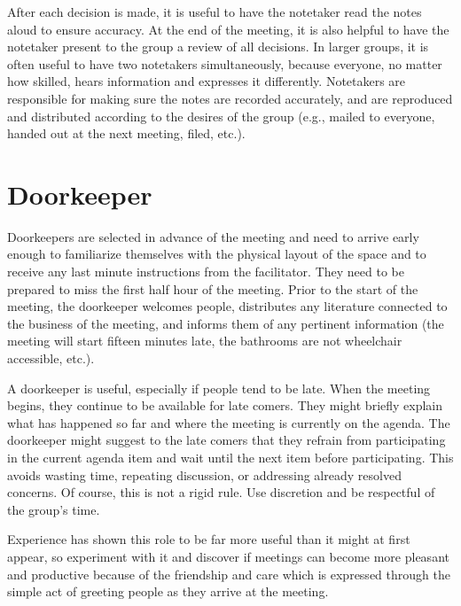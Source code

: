 \squishend%

After each decision is made, it is useful to have the notetaker
read the notes aloud to ensure accuracy. At the end of the meeting,
it is also helpful to have the notetaker present to the group a
review of all decisions. In larger groups, it is often useful to
have two notetakers simultaneously, because everyone, no matter how
skilled, hears information and expresses it differently. Notetakers
are responsible for making sure the notes are recorded accurately,
and are reproduced and distributed according to the desires of the
group (e.g., mailed to everyone, handed out at the next meeting,
filed, etc.).


\section{Doorkeeper}
\label{role:greeter}

Doorkeepers are selected in advance of the meeting and need to
arrive early enough to familiarize themselves with the physical
layout of the space and to receive any last minute instructions
from the facilitator. They need to be prepared to miss the first
half hour of the meeting. Prior to the start of the meeting, the
doorkeeper welcomes people, distributes any literature connected to
the business of the meeting, and informs them of any pertinent
information (the meeting will start fifteen minutes late, the
bathrooms are not wheelchair accessible, etc.).


A doorkeeper is useful, especially if people tend to be late. When
the meeting begins, they continue to be available for
late comers. They might briefly explain what has happened so far and
where the meeting is currently on the agenda. The doorkeeper might
suggest to the late comers that they refrain from participating in
the current agenda item and wait until the next item before
participating. This avoids wasting time, repeating discussion, or
addressing already resolved concerns. Of course, this is not a
rigid rule. Use discretion and be respectful of the group's time.


Experience has shown this role to be far more useful than it might
at first appear, so experiment with it and discover if meetings can
become more pleasant and productive because of the friendship and
care which is expressed through the simple act of greeting people
as they arrive at the meeting.


